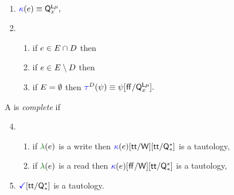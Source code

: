   \begin{enumerate}[topsep=0pt,label=(\textsc{r}\arabic*),ref=\textsc{r}\arabic*]
    \setcounter{enumi}{\value{Bkappa}}
  \item \label{read-kappa-q}
    \begin{math}
      {\color{blue}\kappa}(e) \mathrel{\equiv} \mathsf{Q}^{\smash{\mathsf{L}\mu}}_{x},
    \end{math}
  \item[] 
    \begin{enumerate}[leftmargin=0pt]
      \item \label{read-tau-dep-q}
        if $e\in E\cap D$ then
        \makebox[0pt][l]{%
          \begin{math}
            \aTr{\bEvs}{\bForm} \riff
            (\Qw{\aLoc}\limplies\aVal{=}\aReg)
            \limplies \bForm,
          \end{math}
        }
    \item \label{read-tau-ind-q}
      if $e\in E\setminus D$ then
      \makebox[0pt][l]{\begin{math}
          \aTr{\bEvs}{\bForm} \riff
          \PBR{
            \Qw{\aLoc}
            \limplies
            \PBR{
              \aVal{=}\aReg \lor \aLoc{=}\aReg \lor\RW
            }
          }
          \limplies \bForm [\FALSE/\QL{\aLoc}{\amode}],
        \end{math}}
    \item \label{read-tau-empty-q}
      if $E=\emptyset$ then
      \begin{math}
        \aTr{\bEvs}{\bForm} \riff
        \bForm [\FALSE/\QL{\aLoc}{\amode}].
      \end{math}
    \end{enumerate}
  \end{enumerate}    
  \smallskip

  A \PwT{} is \emph{complete} if
  \begin{enumerate}[,label=(\textsc{c}\arabic*),ref=\textsc{c}\arabic*]
    \setcounter{enumi}{3}
  \item[] 
    \begin{enumerate}[leftmargin=0pt]
    \item \label{top-kappa-write-q}
      if $\labeling(\aEv)$ is a write then ${\color{blue}\kappa}(e)[\mathsf{tt}/\mathsf{W}][\mathsf{tt}/\mathsf{Q}^{*}_{*}]$ is a tautology,
    \item \label{top-kappa-read-q}
      if $\labeling(\aEv)$ is a read then ${\color{blue}\kappa}(e)[\mkern.6mu\mathsf{ff}\mkern.6mu/\mathsf{W}][\mathsf{tt}/\mathsf{Q}^{*}_{*}]$ is a tautology,
    \end{enumerate}
    \setcounter{enumi}{\value{Bterm}}
  \item \label{top-term-q} $\aTerm{}\Qsuball{\TRUE}$ is a tautology.
  \end{enumerate}
